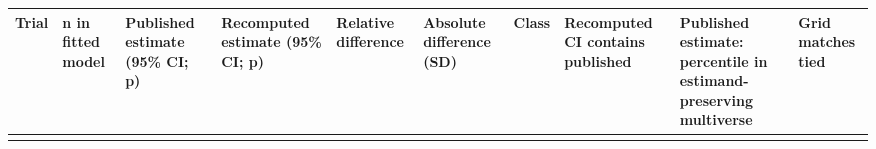 {
\begin{longtable}[]{@{}
  >{\raggedright\arraybackslash}p{}
  >{\raggedleft\arraybackslash}p{}
  >{\raggedright\arraybackslash}p{}
  >{\raggedright\arraybackslash}p{}
  >{\raggedleft\arraybackslash}p{}
  >{\raggedleft\arraybackslash}p{}
  >{\raggedright\arraybackslash}p{}
  >{\raggedright\arraybackslash}p{}
  >{\raggedleft\arraybackslash}p{}
  >{\raggedleft\arraybackslash}p{}@{}}
\toprule\noalign{}
\begin{minipage}[b]{\linewidth}\raggedright
Trial
\end{minipage} & \begin{minipage}[b]{\linewidth}\raggedleft
n in fitted model
\end{minipage} & \begin{minipage}[b]{\linewidth}\raggedright
Published estimate (95\% CI; p)
\end{minipage} & \begin{minipage}[b]{\linewidth}\raggedright
Recomputed estimate (95\% CI; p)
\end{minipage} & \begin{minipage}[b]{\linewidth}\raggedleft
Relative difference
\end{minipage} & \begin{minipage}[b]{\linewidth}\raggedleft
Absolute difference (SD)
\end{minipage} & \begin{minipage}[b]{\linewidth}\raggedright
Class
\end{minipage} & \begin{minipage}[b]{\linewidth}\raggedright
Recomputed CI contains published
\end{minipage} & \begin{minipage}[b]{\linewidth}\raggedleft
Published estimate: percentile in estimand-preserving multiverse
\end{minipage} & \begin{minipage}[b]{\linewidth}\raggedleft
Grid matches tied
\end{minipage} \\
\midrule\noalign{}
\endhead

\end{longtable}}
